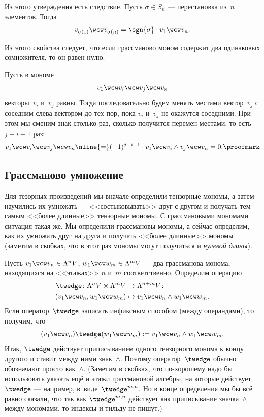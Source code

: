 Из этого утверждения есть следствие. Пусть $\sigma \in S_n$ --- перестановка из~$n$ элементов. Тогда
\[
	v_{\sigma(1)} \wcw
	v_{\sigma(n)} =
	\sgn{\sigma}
	\cdot
	v_1 \wcw v_n
	.
\]

\begin{remark}
	Из этого свойства следует, что если грассманово моном содержит два одинаковых сомножителя, то он равен нулю.
\end{remark}
\begin{proofm}
	Пусть в мономе
	\[
		v_1 \wcw v_i \wcw v_j \wcw v_n
	\]
	векторы~$v_i$ и~$v_j$ равны. Тогда последовательно будем менять местами вектор~$v_j$ с соседним слева вектором до тех пор, пока $v_i$ и~$v_j$ не окажутся соседними. При этом мы сменим знак столько раз, сколько получится перемен местами, то есть $j - i - 1$ раз:
	\begin{multline*}
		v_1 \wcw v_i \wcw v_j \wcw v_n
		\nline{=}
		(-1)^{j - i - 1} \cdot
		v_1 \wcw v_i \wedge v_j \wcw v_n
		=
		0
		.
		\proofmark
	\end{multline*}
\end{proofm}

\subsection{Грассманово умножение}

Для тезорных произведений мы вначале определили тензорные мономы, а затем научились их умножать --- <<состыковывать>> друг с другом и получать тем самым <<более длинные>> тензорные мономы. С грассмановыми мономами ситуация такая же. Мы определили грассмановы мономы, а сейчас определим, как их умножать друг на друга и получать <<более длинные>> мономы (заметим в скобках, что в этот раз мономы могут получиться и \emph{нулевой длины}).

Пусть $v_1 \wcw v_n \in \Lambda^n V$, $w_1 \wcw w_m \in \Lambda^m V$ --- два грассманова монома, находящихся на <<этажах>> $n$ и~$m$ соответственно. Определим операцию
\begin{align*}
	\twedge \colon
	\Lambda^n V \times \Lambda^m V
	&\to
	\Lambda^{n + m} V
	\colon
	\\
	(v_1 \wcw v_n, w_1 \wcw w_m)
	&\mapsto
	v_1 \wcw v_n \wedge w_1 \wcw w_m
	.
\end{align*}
Если оператор~$\twedge$ записать инфиксным способом (между операндами), то получим, что
\begin{equation}
	\label{eq:twedge:infix}
	(v_1 \wcw v_n) \twedge (w_1 \wcw w_m) :=
	v_1 \wcw v_n \wedge w_1 \wcw w_m
	.
\end{equation}
Итак, $\twedge$ действует приписыванием одного тензорного монома к концу другого и ставит между ними знак~$\wedge$. Поэтому оператор~$\twedge$ обычно обозначают просто как~$\wedge$.
(Заметим в скобках, что по-хорошему надо бы использовать указать ещё и этажи грассмановой алгебры, на которые действует~$\twedge$ --- например, в~виде~$\twedge^{m, n}$. Но в конце определения мы бы всё равно сказали, что так как $\twedge^{m, n}$ действует как приписывание значка~$\wedge$ между мономами, то индексы и тильду не пишут.)

